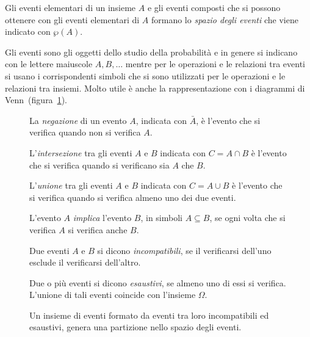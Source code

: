 Gli eventi elementari di un insieme $A$ e gli eventi composti che si possono 
ottenere con gli eventi elementari di $A$ formano lo \emph{spazio degli eventi} 
che viene indicato con $\wp (A)$.

Gli eventi sono gli oggetti dello studio della probabilità e in genere si 
indicano con le lettere maiuscole $A,B,\ldots $ mentre per le operazioni e le 
relazioni tra eventi si usano i corrispondenti simboli che si sono utilizzati 
per le operazioni e le relazioni tra insiemi. Molto utile è anche la 
rappresentazione con i diagrammi di Venn~(figura~\ref{fig:9.1}).
\begin{inaccessibleblock}
 \begin{figure}[tp]
\begin{minipage}[t]{.45\textwidth}
\centering
\caption{La \emph{negazione} di un evento $A$, indicata con $\bar {A}$, è 
l'evento che si verifica quando non si verifica $A$.}\label{fig:9.1}
\end{minipage}\hfil
\begin{minipage}[t]{.45\textwidth}
\centering
\caption{L'\emph{intersezione} tra gli eventi $A$ e $B$ indicata con $C=A\cap B$ 
è l'evento che si verifica quando si verificano sia $A$ che $B$.}
\end{minipage}
\vspace{5px}
\begin{minipage}[t]{.45\textwidth}
\centering
\caption{L'\emph{unione} tra gli eventi $A$ e $B$ indicata con $C=A\cup B$ è 
l'evento che si verifica quando si verifica almeno uno dei due eventi.}
\end{minipage}\hfil
\begin{minipage}[t]{.45\textwidth}
\centering
\caption{L'evento $A$ \emph{implica} l'evento $B$, in simboli $ A \subseteq B$, 
se ogni volta che si verifica $A$ si verifica anche $B$.}
\end{minipage}
\vspace{5px}
\begin{minipage}[t]{.45\textwidth}
\centering
\caption{Due eventi $A$ e $B$ si dicono \emph{incompatibili}, se il verificarsi 
dell'uno esclude il verificarsi dell'altro.}
\end{minipage}\hfil
\begin{minipage}[t]{.45\textwidth}
\centering
\caption{Due o più eventi si dicono \emph{esaustivi}, se almeno uno di essi si 
verifica. L'unione di tali eventi coincide con l'insieme $\Omega$.}
\end{minipage}
\vspace{5px}
\begin{minipage}[t]{.90\textwidth}
\centering
\caption{Un insieme di eventi formato da eventi tra loro incompatibili ed 
esaustivi, genera una partizione nello spazio degli eventi.}
\end{minipage}\hfil
\end{figure}
\end{inaccessibleblock}

